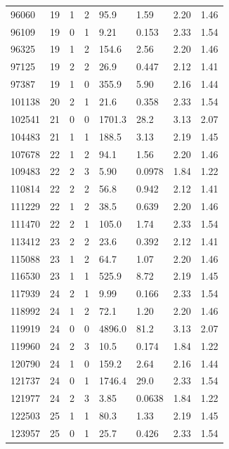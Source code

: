 \documentclass[preview]{standalone}
\begin{document}
{{{\begin{tabular}{L{1.2cm}C{1.2cm} C{0.3cm}C{0.5cm} C{1.4cm}C{1.4cm} C{1.4cm}C{1.4cm}}
  96060  &    19  & 1     &  2 &  95.9  & 1.59  & 2.20 &  1.46   \\ 
  96109  &    19  & 0     &  1 &  9.21  & 0.153  & 2.33 &  1.54   \\ 
  96325  &    19  & 1     &  2 &  154.6  & 2.56  & 2.20 &  1.46   \\ 
  97125  &    19  & 2     &  2 &  26.9  & 0.447  & 2.12 &  1.41   \\ 
  97387  &    19  & 1     &  0 &  355.9  & 5.90  & 2.16 &  1.44   \\ 
  101138  &    20  & 2     &  1 &  21.6  & 0.358  & 2.33 &  1.54   \\ 
  102541  &    21  & 0     &  0 &  1701.3  & 28.2  & 3.13 &  2.07   \\ 
  104483  &    21  & 1     &  1 &  188.5  & 3.13  & 2.19 &  1.45   \\ 
  107678  &    22  & 1     &  2 &  94.1  & 1.56  & 2.20 &  1.46   \\ 
  109483  &    22  & 2     &  3 &  5.90  & 0.0978  & 1.84 &  1.22   \\ 
  110814  &    22  & 2     &  2 &  56.8  & 0.942  & 2.12 &  1.41   \\ 
  111229  &    22  & 1     &  2 &  38.5  & 0.639  & 2.20 &  1.46   \\ 
  111470  &    22  & 2     &  1 &  105.0  & 1.74  & 2.33 &  1.54   \\ 
  113412  &    23  & 2     &  2 &  23.6  & 0.392  & 2.12 &  1.41   \\ 
  115088  &    23  & 1     &  2 &  64.7  & 1.07  & 2.20 &  1.46   \\ 
  116530  &    23  & 1     &  1 &  525.9  & 8.72  & 2.19 &  1.45   \\ 
  117939  &    24  & 2     &  1 &  9.99  & 0.166  & 2.33 &  1.54   \\ 
  118992  &    24  & 1     &  2 &  72.1  & 1.20  & 2.20 &  1.46   \\ 
  119919  &    24  & 0     &  0 &  4896.0  & 81.2  & 3.13 &  2.07   \\ 
  119960  &    24  & 2     &  3 &  10.5  & 0.174  & 1.84 &  1.22   \\ 
  120790  &    24  & 1     &  0 &  159.2  & 2.64  & 2.16 &  1.44   \\ 
  121737  &    24  & 0     &  1 &  1746.4  & 29.0  & 2.33 &  1.54   \\ 
  121977  &    24  & 2     &  3 &  3.85  & 0.0638  & 1.84 &  1.22   \\ 
  122503  &    25  & 1     &  1 &  80.3  & 1.33  & 2.19 &  1.45   \\ 
  123957  &    25  & 0     &  1 &  25.7  & 0.426  & 2.33 &  1.54   \\ 
\hline 
\end{tabular} 

}}}
\end{document}
